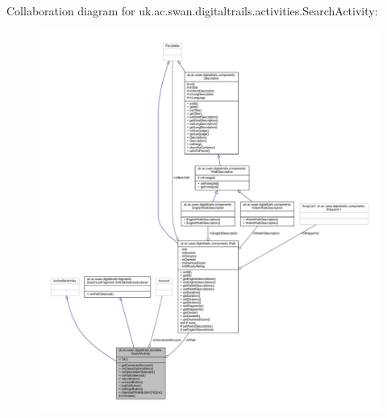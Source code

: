 Collaboration diagram for uk.\+ac.\+swan.\+digitaltrails.\+activities.\+Search\+Activity\+:
\nopagebreak
\begin{figure}[H]
\begin{center}
\leavevmode
\includegraphics[width=350pt]{classuk_1_1ac_1_1swan_1_1digitaltrails_1_1activities_1_1_search_activity__coll__graph}
\end{center}
\end{figure}
